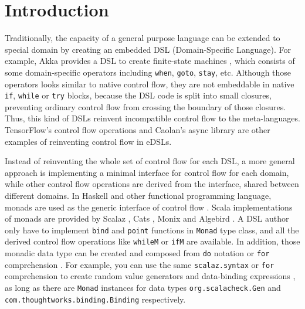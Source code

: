 \section{Introduction}\label{Introduction}

Traditionally, the capacity of a general purpose language can be extended to special domain by creating an embedded DSL (Domain-Specific Language). For example, Akka provides a DSL to create finite-state machines \cite{lightbend2017akka}, which consists of some domain-specific operators including \lstinline{when}, \lstinline{goto}, \lstinline{stay}, etc. Although those operators looks similar to native control flow, they are not embeddable in native \lstinline{if}, \lstinline{while} or \lstinline{try} blocks, because the DSL code is split into small closures, preventing ordinary control flow from crossing the boundary of those closures. Thus, this kind of DSLs reinvent incompatible control flow to the meta-languages. TensorFlow's control flow operations \cite{abadi2016tensorflow} and Caolan's async library \cite{caolan2017async} are other examples of reinventing control flow in eDSLs.

Instead of reinventing the whole set of control flow for each DSL, a more general approach is implementing a minimal interface for control flow for each domain, while other control flow operations are derived from the interface, shared between different domains. In Haskell and other functional programming language, monads are used as the generic interface of control flow \cite{wadler1990comprehending,wadler1992essence,jones1993composing}. Scala implementations of monads are provided by Scalaz \cite{kenji2017scalaz}, Cats \cite{typelevel2017cats}, Monix \cite{nedelcu2017monix} and Algebird \cite{twitter2016algebird}. A DSL author only have to implement \lstinline{bind} and \lstinline{point} functions in \lstinline{Monad} type class, and all the derived control flow operations like \lstinline{whileM} or \lstinline{ifM} are available. In addition, those monadic data type can be created and composed from \lstinline{do} notation \cite{jones1998haskell} or \lstinline{for} comprehension \cite{odersky2004scala}. For example, you can use the same \lstinline{scalaz.syntax} or \lstinline{for} comprehension to create random value generators \cite{nilsson2015scalacheck} and data-binding expressions \cite{yangbo2016binding}, as long as there are \lstinline{Monad} instances for data types \lstinline{org.scalacheck.Gen} and \lstinline{com.thoughtworks.binding.Binding} respectively.

